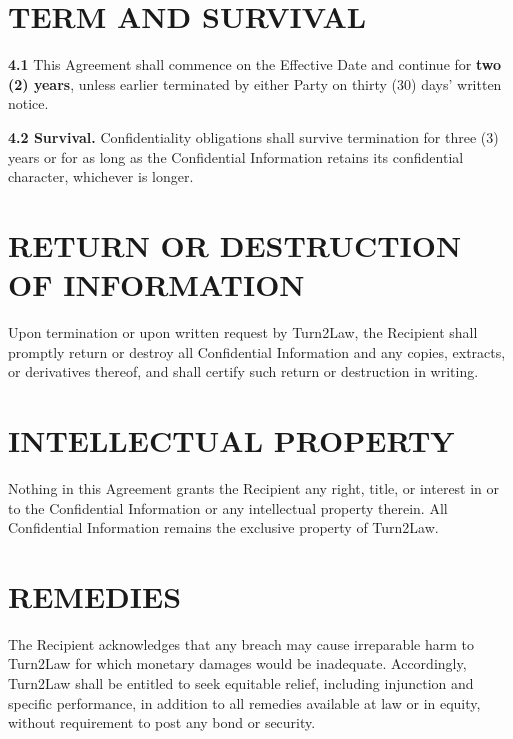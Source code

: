 \documentclass[10pt]{article}
\begin{document}
\section{TERM AND SURVIVAL}

\textbf{4.1} This Agreement shall commence on the Effective Date and continue for \textbf{two (2) years}, unless earlier terminated by either Party on thirty (30) days' written notice.

\textbf{4.2 Survival.} Confidentiality obligations shall survive termination for three (3) years or for as long as the Confidential Information retains its confidential character, whichever is longer.

\section{RETURN OR DESTRUCTION OF INFORMATION}

Upon termination or upon written request by Turn2Law, the Recipient shall promptly return or destroy all Confidential Information and any copies, extracts, or derivatives thereof, and shall certify such return or destruction in writing.

\section{INTELLECTUAL PROPERTY}

Nothing in this Agreement grants the Recipient any right, title, or interest in or to the Confidential Information or any intellectual property therein. All Confidential Information remains the exclusive property of Turn2Law.

\section{REMEDIES}

The Recipient acknowledges that any breach may cause irreparable harm to Turn2Law for which monetary damages would be inadequate. Accordingly, Turn2Law shall be entitled to seek equitable relief, including injunction and specific performance, in addition to all remedies available at law or in equity, without requirement to post any bond or security.
\end{document}
